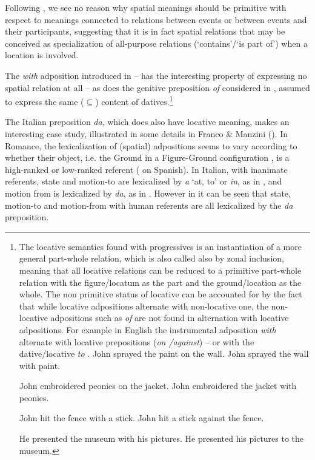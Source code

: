 \documentclass[output=paper,modfonts,nonflat,newtxmath,colorlinks,citecolor=brown]{langsci/langscibook}
\begin{document}
Following \citet{ManziniSavoia2011, FrancoManzini2017Gen, FrancoManzini2017Ins}, we see no reason why spatial meanings should be primitive with respect to meanings connected to relations between events or between events and their participants, suggesting that it is in fact spatial relations that may be conceived as specialization of all-purpose relations (‘contains’/‘is part of’) when a location is involved. 

The \textit{with} adposition introduced in -- has the interesting property of expressing no spatial relation at all \citep{Levinson2011} – as does the genitive preposition \textit{of} considered in , assumed to express the same (${\subseteq}$) content of datives.\footnote{The locative semantics found with progressives is an instantiation of a more general part-whole relation, which is also called also by \citet[170]{BelvindenDikken1997} {zonal inclusion}, meaning that all locative relations can be reduced to a primitive part-whole relation with the {figure/locatum} as the {part} and the {ground/location} as the {whole}. The non primitive status of locative can be accounted for by the fact that while locative adpositions alternate with non-locative one, the non-locative adpositions such as \textit{of} are not found in alternation with locative adpositions. For example in English the instrumental adposition \textit{with} alternate with locative prepositions (\textit{on /against}) -- or with the dative/locative \textit{to} . 
\ea %
    \label{ex:franco:i}
    \ea John sprayed the paint on the wall. 
    \ex John sprayed the wall with paint.
    \z
    \z

\ea %
    \label{ex:franco:ii}
    \ea John embroidered peonies on the jacket.
    \ex John embroidered the jacket with peonies.
    \z
    \z
    
\ea %
    \label{ex:franco:iii}
    \ea John hit the fence with a stick.
    \ex John hit a stick against the fence.
    \z
    \z
    
\ea %
    \label{ex:franco:iv}
    \ea He presented the museum with his pictures.
    \ex He presented his pictures to the museum.
    \z
    \z

} 

The Italian preposition \textit{da}, which does also have locative meaning, makes an interesting case study, illustrated in some details in Franco \& Manzini (\citeyear{FrancoManzini2017Gen, FrancoManzini2017Ins}). In Romance, the lexicalization of (spatial) adpositions seems to vary according to whether their object, i.e. the Ground in a Figure-Ground configuration \citep{Svenonius2006axial}, is a high-ranked or low-ranked referent (\citealt{Fabregas2015direccionales} on Spanish). In Italian, with inanimate referents, state and motion-to are lexicalized by \textit{a} ‘at, to’ or \textit{in}, as in , and motion from is lexicalized by \textit{da}, as in . However in  it can be seen that state, motion-to and motion-from with human referents are all lexicalized by the \textit{da} preposition. 
\end{document}
